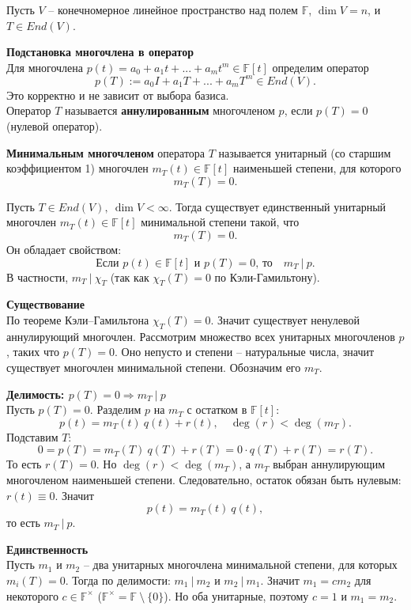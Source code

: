 \documentclass[14pt]{extreport}
\begin{document}
    \begin{defbox}
        Пусть $V$ – конечномерное линейное пространство над полем $\mathbb{F}$, $\dim V = n$, и $T \in End(V)$.
        
        \textbf{Подстановка многочлена в оператор}\\
        Для многочлена $p(t) = a_0 + a_1t + ... + a_mt^m \in \mathbb{F}[t]$ определим оператор
        \[
        p(T) := a_0I + a_1T + ... + a_mT^m \in End(V).
        \]
        Это корректно и не зависит от выбора базиса.\\
        Оператор $T$ называется \textbf{аннулированным} многочленом $p$, если $p(T) = 0$ (нулевой оператор).

        \textbf{Минимальным многочленом} оператора $T$ называется унитарный (со старшим коэффициентом 1) многочлен $m_T(t) \in \mathbb{F}[t]$ наименьшей степени, для которого
        \[
        m_T(T) = 0.
        \]
    \end{defbox}

    \begin{thbox}
        Пусть $T \in End(V),\ \dim V < \infty$. Тогда существует единственный унитарный многочлен $m_T(t) \in \mathbb{F}[t]$ минимальной степени такой, что
        \[
        m_T(T) = 0.
        \]
        Он обладает свойством:
        \[
        \text{Если $p(t) \in \mathbb{F}[t]$ и $p(T)=0$, то} \quad m_T\ |\ p.
        \]
        В частности, $m_T\ |\ \chi_T$ (так как $\chi_T(T) = 0$ по Кэли-Гамильтону).
    \end{thbox}

    \begin{prbox}
        \textbf{Существование}\\
        По теореме Кэли–Гамильтона $\chi_T(T) = 0$. Значит существует ненулевой аннулирующий многочлен. Рассмотрим множество всех унитарных многочленов $p$, таких что $p(T)=0$. Оно непусто и степени – натуральные числа, значит существует многочлен минимальной степени. Обозначим его $m_T$.

        \textbf{Делимость: $p(T)=0 \Rightarrow m_T\ |\ p$}\\
        Пусть $p(T)=0$. Разделим $p$ на $m_T$ с остатком в $\mathbb{F}[t]$:
        \[
        p(t) = m_T(t)\ q(t) + r(t), \quad \deg(r) < \deg(m_T).
        \]
        Подставим $T$:
        \[
        0 = p(T) = m_T(T)\ q(T) + r(T) = 0 \cdot q(T) + r(T) = r(T).
        \]
        То есть $r(T)=0$. Но $\deg(r) < \deg(m_T)$, а $m_T$ выбран аннулирующим многочленом наименьшей степени. Следовательно, остаток обязан быть нулевым: $r(t) \equiv 0$. Значит
        \[
        p(t) = m_T(t)\ q(t),
        \]
        то есть $m_T\ |\ p$.

        \textbf{Единственность}\\
        Пусть $m_1$ и $m_2$ – два унитарных многочлена минимальной степени, для которых $m_i(T)=0$. Тогда по делимости: $m_1\ |\ m_2$ и $m_2\ |\ m_1$. Значит $m_1 = cm_2$ для некоторого $c \in \mathbb{F}^\times$ ($\mathbb{F}^\times = \mathbb{F}\ \setminus\ \{0\}$). Но оба унитарные, поэтому $c=1$ и $m_1=m_2$.
    \end{prbox}
\end{document}
